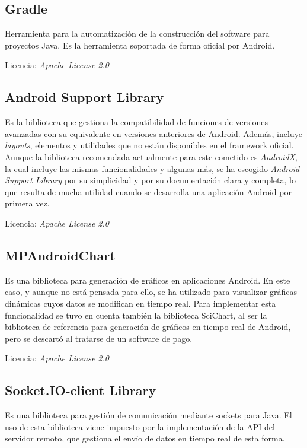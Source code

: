 \subsection{Gradle}

Herramienta para la automatización de la construcción del software para proyectos Java. Es la herramienta soportada de forma oficial por Android.

Licencia: \textit{Apache License 2.0} 

\subsection{Android Support Library}

Es la biblioteca que gestiona la compatibilidad de funciones de versiones avanzadas con su equivalente en versiones anteriores de Android. Además, incluye \textit{layouts}, elementos y utilidades que no están disponibles en el framework oficial. Aunque la biblioteca recomendada actualmente para este cometido es \textit{AndroidX}, la cual incluye las mismas funcionalidades y algunas más, se ha escogido \textit{Android Support Library} por su simplicidad y por su documentación clara y completa, lo que resulta de mucha utilidad cuando se desarrolla una aplicación Android por primera vez. 

Licencia: \textit{Apache License 2.0}

\subsection{MPAndroidChart}

Es una biblioteca para generación de gráficos en aplicaciones Android. En este caso, y aunque no está pensada para ello, se ha utilizado para visualizar gráficas dinámicas cuyos datos se modifican en tiempo real. Para implementar esta funcionalidad se tuvo en cuenta también la biblioteca SciChart, al ser la biblioteca de referencia para generación de gráficos en tiempo real de Android, pero se descartó al tratarse de un software de pago. 

Licencia: \textit{Apache License 2.0}

\subsection{Socket.IO-client Library}

Es una biblioteca para gestión de comunicación mediante sockets para Java. El uso de esta biblioteca viene impuesto por la implementación de la API del servidor remoto, que gestiona el envío de datos en tiempo real de esta forma. 

